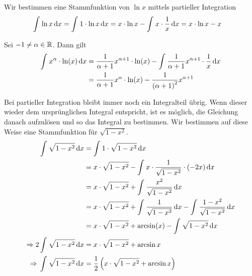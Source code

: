 \begin{beispiel}
    Wir bestimmen eine Stammfunktion von $\ln x$ mittels partieller Integration
    \begin{align*}
        \int_{}^{} \ln x \mathop{}\!\mathrm{d} x &= \int_{}^{} 1\cdot\ln x \mathop{}\!\mathrm{d} x = x\cdot\ln x - \int_{}^{} x\cdot \frac{1}{x} \mathop{}\!\mathrm{d} x = x\cdot\ln x - x
    \end{align*}
\end{beispiel}

\begin{beispiel}
    Sei $-1\neq\alpha\in\mathbb{R}$. Dann gilt
    \begin{align*}
        \int_{}^{} x^{\alpha}\cdot \ln\of{x} \dif x &= \frac{1}{\alpha+1}x^{\alpha+1}\cdot \ln\of{x} - \int_{}^{} \frac{1}{\alpha+1}x^{\alpha+1}\cdot\frac{1}{x} \dif x\\
        &= \frac{1}{\alpha+1}x^{\alpha}\cdot\ln\of{x} - \frac{1}{\pair{\alpha+1}^2}x^{\alpha+1}
    \end{align*}
\end{beispiel}

\begin{beispiel}
    \label{beispiel:stammfunktion-sqrt-1-xsqrt}
    Bei partieller Integration bleibt immer noch ein Integralteil übrig. Wenn dieser wieder dem ursprünglichen Integral entspricht, ist es möglich, die Gleichung danach aufzulösen und so das Integral zu bestimmen. Wir bestimmen auf diese Weise eine Stammfunktion für $\sqrt{1-x^2}$. \newpage
    \begin{align*}
        \int_{}^{} \sqrt{1-x^2} \dif x &= \int_{}^{} 1\cdot\sqrt{1-x^2} \dif x\\
        &= x\cdot\sqrt{1-x^2} - \int_{}^{} x\cdot\frac{1}{\sqrt{1-x^2}}\cdot\pair{-2x} \dif x\\
        &= x\cdot\sqrt{1-x^2} + \int_{}^{} \frac{x^2}{\sqrt{1-x^2}} \dif x\\
        &= x\cdot\sqrt{1-x^2} + \int_{}^{} \frac{1}{\sqrt{1-x^2}} \dif x - \int_{}^{} \frac{1-x^2}{\sqrt{1-x^2}} \dif x\\
        &= x\cdot\sqrt{1-x^2} + \arcsin\of{x} - \int_{}^{} \sqrt{1-x^2} \dif x\\
        \impl 2 \int_{}^{} \sqrt{1-x^2} \dif x &= x\cdot\sqrt{1-x^2} + \arcsin x\\
        \impl \int_{}^{} \sqrt{1-x^2} \dif x &= \frac{1}{2}\pair{x\cdot\sqrt{1-x^2} + \arcsin x}
    \end{align*}
\end{beispiel}

